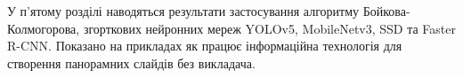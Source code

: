 У п'ятому розділі наводяться результати 
застосування алгоритму Бойкова-Колмогорова,
згорткових нейронних мереж  YOLOv5, MobileNetv3, SSD та
Faster R-CNN. Показано на прикладах як працює інформаційна
технологія для створення панорамних слайдів без викладача.